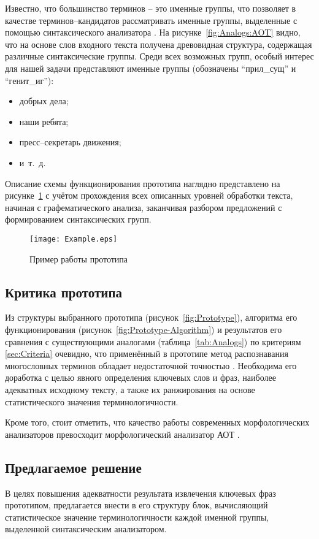 Известно, что большинство терминов – это именные группы, что
позволяет в качестве терминов--кандидатов рассматривать именные
группы, выделенные с помощью синтаксического анализатора
\cite{Braslavsky08}. На рисунке~\ref{fig:Analogs:AOT} видно,
что на основе слов входного текста получена древовидная
структура, содержащая различные синтаксические группы. Среди
всех возможных групп, особый интерес для нашей задачи представляют
именные группы (обозначены “прил\_сущ” и “генит\_иг”):
\begin{itemize}
  \item добрых дела;
  \item наши ребята;
  \item пресс--секретарь движения;
  \item и\ т.\ д.
\end{itemize}

Описание схемы функционирования прототипа наглядно представлено на
рисунке~\ref{fig:Example} с учётом прохождения всех описанных
уровней обработки текста, начиная с графематического анализа,
заканчивая разбором предложений с формированием синтаксических групп.

\begin{figure}[!ht]
  \centering
  \texttt{[image: Example.eps]}
  \caption{Пример работы прототипа}
  \label{fig:Example}
\end{figure}

\subsection{Критика прототипа}
\label{subsec:Critic}
Из структуры выбранного прототипа (рисунок~\ref{fig:Prototype}),
алгоритма его функционирования (рисунок~\ref{fig:Prototype-Algorithm})
и результатов его сравнения с существующими аналогами
(таблица~\ref{tab:Analogs}) по критериям \ref{sec:Criteria} очевидно,
что применённый в прототипе метод распознавания многословных терминов
обладает недостаточной точностью \cite{Braslavsky08}. Необходима его
доработка с целью явного определения ключевых слов и фраз, наиболее
адекватных исходному тексту, а также их ранжирования на основе
статистического значения терминологичности.

Кроме того, стоит отметить, что качество работы современных
морфологических анализаторов превосходит \cite{Lyashevskaya10}
морфологический анализатор АОТ \cite{Sokirko04}.

\subsection{Предлагаемое решение}
\label{subsec:Solution}
В целях повышения адекватности результата извлечения ключевых фраз
прототипом, предлагается внести в его структуру блок, вычисляющий
статистическое значение терминологичности каждой именной группы,
выделенной синтаксическим анализатором.

